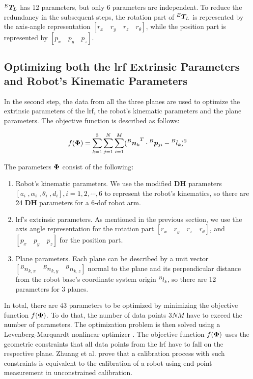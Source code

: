 ${^E}\vb*{T}_L$ has 12 parameters, but only 6 parameters are independent. To reduce the redundancy in the subsequent steps, the rotation part of ${^E}\vb*{T}_L$ is represented by the axis-angle representation $[r_x \quad r_y \quad r_z \quad r_{\theta}]$, while the position part is represented by  $[p_x \quad p_y\quad p_z]$.


\subsection{Optimizing both the \ac{lrf} Extrinsic Parameters and Robot's Kinematic Parameters}
\label{sec:second_step}
In the second step, the data from all the three planes are used to optimize the extrinsic parameters of the \ac{lrf}, the robot's kinematic parameters and the plane parameters. The objective function is described as follows:

\begin{equation}
 f (\vb*{\Phi}) =  \sum_{k=1}^{3} \sum_{j=1}^{N} \sum_{i=1}^{M} ({{^B}\vb*{n}_k}^T \cdot {^B}\vb*{p}_{ji} - {^B}l_k)^2
\end{equation}

The parameters $\vb*{\Phi}$ consist of the following:
\begin{enumerate}
\item Robot's kinematic parameters. We use the modified \textbf{DH} parameters \cite{Hayati1985} $[a_i \;, \alpha_i \;,\theta_i \;,d_i], i=1, 2, \cdots ,6$ to represent the robot's kinematics, so there are 24 \textbf{DH} parameters for a 6-\ac{dof} robot arm. 
\item \ac{lrf}'s extrinsic parameters. As mentioned in the previous section, we use the axis angle representation for the rotation part $[r_x \quad r_y \quad r_z \quad r_{\theta}]$, and $[p_x \quad p_y\quad p_z]$ for the position part. 
\item Plane parameters. Each plane can be described by a unit vector $[{^B}n_{k,x}\quad {^B}n_{k,y}\quad {^B}n_{k,z}]$ normal to the plane and its perpendicular distance from the robot base's coordinate system origin ${^B}l_{k}$, so there are 12 parameters for 3 planes.
\end{enumerate}

In total, there are 43 parameters to be optimized by minimizing the objective function $f(\vb*{\Phi})$. To do that, the number of data points $3NM$ have to exceed the number of parameters. The optimization problem is then solved using a Levenberg-Marquardt nonlinear optimizer \cite{Newville2014}. The objective function $f(\vb*{\Phi})$ uses the geometric constraints that all data points from the \ac{lrf} have to fall on the respective plane. Zhuang et al. \cite{Zhuang1999} prove that a calibration process with such constraints is equivalent to the calibration of a robot using end-point measurement in unconstrained calibration. 

